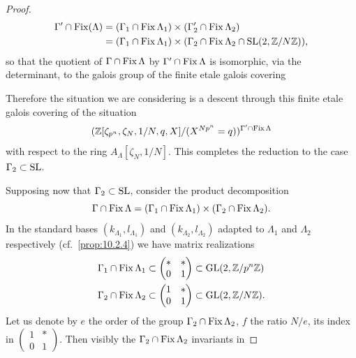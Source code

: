 \begin{proof}
\begin{align*}
\Gamma' \cap \operatorname{Fix}(\Lambda) &= (\Gamma_1 \cap \operatorname{Fix}\Lambda_1) \times (\Gamma_2' \cap \operatorname{Fix}\Lambda_2) \\
&= (\Gamma_1 \cap \operatorname{Fix}\Lambda_1) \times (\Gamma_2 \cap \operatorname{Fix}\Lambda_2 \cap \operatorname{SL}(2, \mathbb{Z}/N\mathbb{Z})) ,
\end{align*}
so that the quotient of $\Gamma \cap \operatorname{Fix}\Lambda$ by $\Gamma' \cap \operatorname{Fix}\Lambda$ is isomorphic, via the determinant, to the galois group of the finite etale galois covering
\begin{center}
\end{center}
Therefore the situation we are considering is a descent through this finite etale galois covering of the situation
\[
(\mathbb{Z}[\zeta_{p^n}, \zeta_N, 1/N, q, X]/(X^{Np^n} = q))^{\Gamma' \cap \operatorname{Fix}\Lambda}
\]
with respect to the ring $A_\Lambda[\zeta_N, 1/N]$. This completes the reduction to the case $\Gamma_2 \subset \operatorname{SL}$.
\par
Supposing now that $\Gamma_2 \subset \operatorname{SL}$, consider the product decomposition
\[
\Gamma \cap \operatorname{Fix}\Lambda = (\Gamma_1 \cap \operatorname{Fix}\Lambda_1) \times (\Gamma_2 \cap \operatorname{Fix}\Lambda_2) .
\]
In the standard bases $(k_{\Lambda_1}, l_{\Lambda_1})$ and $(k_{\Lambda_2}, l_{\Lambda_2})$ adapted to $\Lambda_1$ and $\Lambda_2$ respectively (cf.~\ref{prop:10.2.4}) we have matrix realizations
\begin{align*}
\Gamma_1 \cap \operatorname{Fix}\Lambda_1 &\subset \begin{pmatrix} * & * \\ 0 & 1 \end{pmatrix} \subset \operatorname{GL}(2, \mathbb{Z}/p^n\mathbb{Z}) \\
\Gamma_2 \cap \operatorname{Fix}\Lambda_2 &\subset \begin{pmatrix} 1 & * \\ 0 & 1 \end{pmatrix} \subset \operatorname{GL}(2, \mathbb{Z}/N\mathbb{Z}) .
\end{align*}
Let us denote by $e$ the order of the group $\Gamma_2 \cap \operatorname{Fix}\Lambda_2$, $f$ the ratio $N/e$, its index in $\begin{pmatrix} 1 & * \\ 0 & 1 \end{pmatrix}$. Then visibly the $\Gamma_2 \cap \operatorname{Fix}\Lambda_2$ invariants in

\end{proof}
